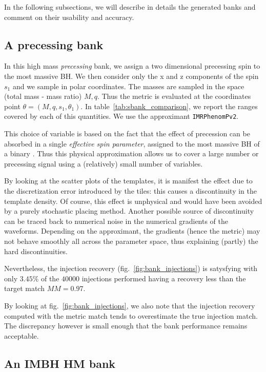 \documentclass[twocolumn,showpacs,preprintnumbers,nofootinbib,prd,
superscriptaddress,10pt]{revtex4-2}
\begin{document}
In the following subsections, we will describe in details the generated banks and comment on their usability and accuracy.

\subsection{A precessing bank}\label{sec:precessing_bank}
	
In this high mass {\it precessing} bank, we assign a two dimensional precessing spin to the most massive BH. We then consider only the x and z components of the spin $s_1$ and we sample in polar coordinates. The masses are sampled in the space (total mass - mass ratio) $M,q$.  Thus the metric is evaluated at the coordinates point $\theta = (M, q, s_1, \theta_1)$. In table~\ref{tab:sbank_comparison}, we report the ranges covered by each of this quantities. We use the approximant \texttt{IMRPhenomPv2}.

This choice of variable is based on the fact that the effect of precession can be absorbed in a single {\it effective spin parameter}, assigned to the most massive BH of a binary \cite{}. Thus this physical approximation allows us to cover a large number or precessing signal using a (relatively) small number of variables.

By looking at the scatter plots of the templates, it is manifest the effect due to the discretization error introduced by the tiles: this causes a discontinuity in the template density. Of course, this effect is unphysical and would have been avoided by a purely stochastic placing method.
Another possible source of discontinuity can be traced back to numerical noise in the numerical gradients of the waveforms. Depending on the approximant, the gradients (hence the metric) may not behave smoothly all across the parameter space, thus explaining (partly) the hard discontinuities.

Nevertheless, the injection recovery (fig.~\ref{fig:bank_injections}) is satysfying with only $3.45\%$ of the $40000$ injections performed having a recovery less than the target match $MM = 0.97$.

By looking at fig.~\ref{fig:bank_injections}, we also note that the injection recovery computed with the metric match tends to overestimate the true injection match. The discrepancy however is small enough that the bank performance remains acceptable.

\subsection{An IMBH HM bank}\label{sec:HM_bank}
\end{document}
